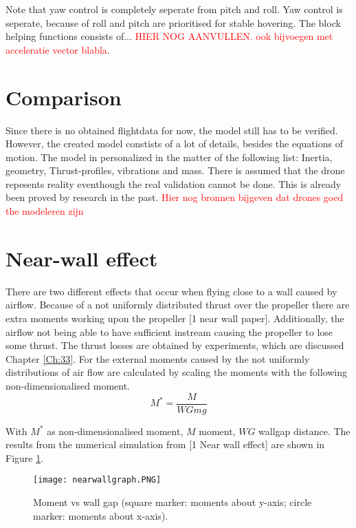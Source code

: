 Note that yaw control is completely seperate from pitch and roll. Yaw control is seperate, because of roll and pitch are prioritised for stable hovering. The block helping functions consists of... \textcolor{red}{HIER NOG AANVULLEN. ook bijvoegen met acceleratie vector blabla}.

\section{Comparison}
Since there is no obtained flightdata for now, the model still has to be verified. However, the created model constists of a lot of details, besides the equations of motion. The model in personalized in the matter of the following list: Inertia, geometry, Thrust-profiles, vibrations and mass. There is assumed that the drone repesents reality eventhough the real validation cannot be done. This is already been proved by  research in the past. \textcolor{red}{Hier nog bronnen bijgeven dat drones goed the modeleren zijn}\\

\section{Near-wall effect}
There are two different effects that occur when flying close to a wall caused by airflow. Because of a not uniformly distributed thrust over the propeller there are extra moments working upon the propeller [1 near wall paper]. Additionally, the airflow not being able to have sufficient instream causing the propeller to lose some thrust. The thrust losses are obtained by experiments, which are discussed Chapter \ref{Ch:33}. For the external moments caused by the not uniformly distributions of air flow are calculated by scaling the moments with the following non-dimensionalised moment.
\begin{equation}
M^{*}= \frac{M}{WG mg}
\end{equation}

With $M^{*}$ as non-dimensionalised moment, $M$ moment, $WG$ wallgap distance. The results from the numerical simulation from [1 Near wall effect] are shown in Figure \ref{fig:nearwall}.

\begin{figure}[H]
\centering
\texttt{[image: nearwallgraph.PNG]}
\caption{Moment vs wall gap (square marker: moments about y-axis; circle marker: moments about x-axis).}
\label{fig:nearwall}
\end{figure}

